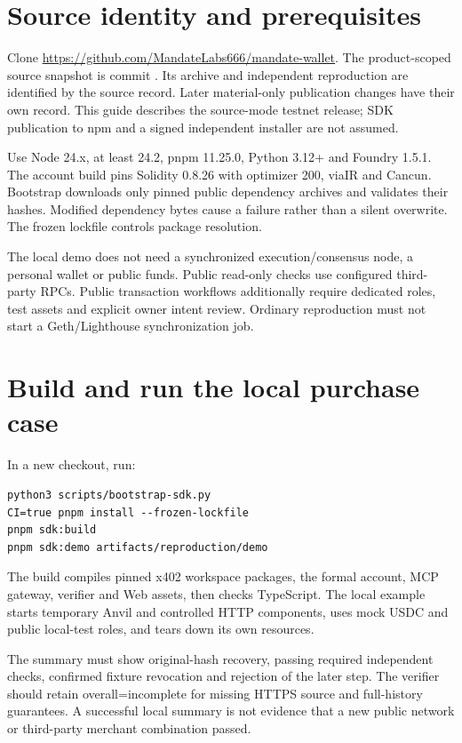 \section{Source identity and prerequisites}
Clone \url{https://github.com/MandateLabs666/mandate-wallet}. The product-scoped source snapshot is commit . Its archive and independent reproduction are identified by the source record. Later material-only publication changes have their own record. This guide describes the source-mode testnet release; SDK publication to npm and a signed independent installer are not assumed.\citep{implementation,repro}

Use Node 24.x, at least 24.2, pnpm 11.25.0, Python 3.12+ and Foundry 1.5.1. The account build pins Solidity 0.8.26 with optimizer 200, viaIR and Cancun. Bootstrap downloads only pinned public dependency archives and validates their hashes. Modified dependency bytes cause a failure rather than a silent overwrite. The frozen lockfile controls package resolution.

The local demo does not need a synchronized execution/consensus node, a personal wallet or public funds. Public read-only checks use configured third-party RPCs. Public transaction workflows additionally require dedicated roles, test assets and explicit owner intent review. Ordinary reproduction must not start a Geth/Lighthouse synchronization job.

\section{Build and run the local purchase case}
In a new checkout, run:
\begin{lstlisting}
python3 scripts/bootstrap-sdk.py
CI=true pnpm install --frozen-lockfile
pnpm sdk:build
pnpm sdk:demo artifacts/reproduction/demo
\end{lstlisting}
The build compiles pinned x402 workspace packages, the formal account, MCP gateway, verifier and Web assets, then checks TypeScript. The local example starts temporary Anvil and controlled HTTP components, uses mock USDC and public local-test roles, and tears down its own resources.

The summary must show original-hash recovery, passing required independent checks, confirmed fixture revocation and rejection of the later step. The verifier should retain overall=incomplete for missing HTTPS source and full-history guarantees. A successful local summary is not evidence that a new public network or third-party merchant combination passed.

